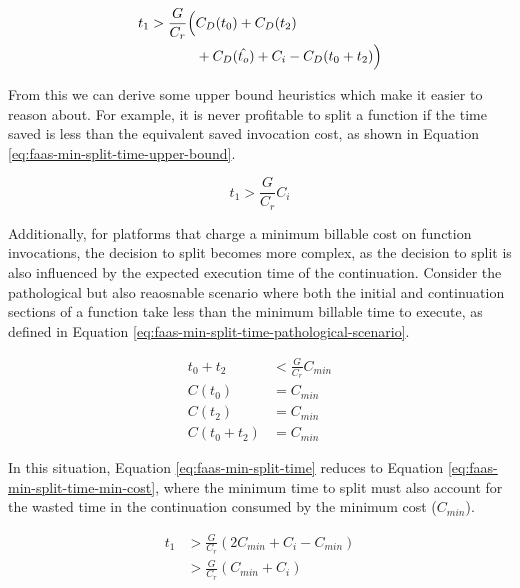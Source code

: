 \begin{equation} \label{eq:faas-min-split-time}
\begin{aligned}
t_1 > \frac{G}{C_r} \Bigl( & C_D(t_0) + C_D(t_2) \\
& + C_D(\hat{t_o}) + C_i - C_D(t_0 + t_2) \Bigl)
\end{aligned}
\end{equation}

From this we can derive some upper bound heuristics which make it easier to reason about. For example, it is never profitable to split a function if the time saved is less than the equivalent saved invocation cost, as shown in Equation \ref{eq:faas-min-split-time-upper-bound}.

\begin{equation} \label{eq:faas-min-split-time-upper-bound}
t_1 > \frac{G}{C_r} C_i
\end{equation}

Additionally, for platforms that charge a minimum billable cost on function invocations, the decision to split becomes more complex, as the decision to split is also influenced by the expected execution time of the continuation. Consider the pathological but also reaosnable scenario where both the initial and continuation sections of a function take less than the minimum billable time to execute, as defined in Equation \ref{eq:faas-min-split-time-pathological-scenario}.

\begin{equation} \label{eq:faas-min-split-time-pathological-scenario}
\begin{aligned}
t_0 + t_2 & < \frac{G}{C_r} C_{min} \\
C(t_0) & = C_{min} \\
C(t_2) & = C_{min} \\
C(t_0 + t_2) & = C_{min}
\end{aligned}
\end{equation}

In this situation, Equation \ref{eq:faas-min-split-time} reduces to Equation \ref{eq:faas-min-split-time-min-cost}, where the minimum time to split must also account for the wasted time in the continuation consumed by the minimum cost ($C_{min}$).

\begin{equation} \label{eq:faas-min-split-time-min-cost}
\begin{aligned}
t_1 & > \frac{G}{C_r} \left( 2 C_{min} + C_i - C_{min} \right) \\
    & > \frac{G}{C_r} \left( C_{min} + C_i \right)
\end{aligned}
\end{equation}

